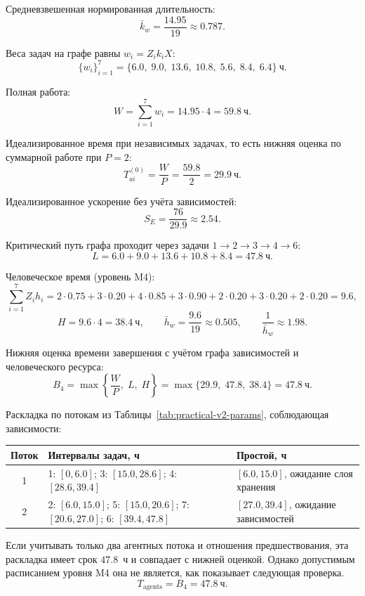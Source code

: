 \documentclass[12pt,a4paper]{article}
\theoremstyle{definition}
\begin{document}
Средневзвешенная нормированная длительность:
\[
  \bar{k}_w = \frac{14.95}{19} \approx 0.787.
\]

Веса задач на графе равны $w_i = Z_i k_i X$:
\[
  \{w_i\}_{i=1}^{7} = \{6.0,\; 9.0,\; 13.6,\; 10.8,\; 5.6,\; 8.4,\; 6.4\}~\text{ч}.
\]

Полная работа:
\[
  W = \sum_{i=1}^{7} w_i = 14.95 \cdot 4 = 59.8~\text{ч}.
\]

Идеализированное время при независимых задачах, то есть нижняя оценка по суммарной работе при $P = 2$:
\[
  T_{ai}^{(0)} = \frac{W}{P} = \frac{59.8}{2} = 29.9~\text{ч}.
\]

Идеализированное ускорение без учёта зависимостей:
\[
  S_E = \frac{76}{29.9} \approx 2.54.
\]

Критический путь графа проходит через задачи $1 \to 2 \to 3 \to 4 \to 6$:
\[
  L = 6.0 + 9.0 + 13.6 + 10.8 + 8.4 = 47.8~\text{ч}.
\]

Человеческое время (уровень M4):
\[
  \sum_{i=1}^{7} Z_i h_i = 2{\cdot}0.75 + 3{\cdot}0.20 + 4{\cdot}0.85 + 3{\cdot}0.90 + 2{\cdot}0.20 + 3{\cdot}0.20 + 2{\cdot}0.20 = 9.6,
\]
\[
  H = 9.6 \cdot 4 = 38.4~\text{ч},
  \qquad
  \bar{h}_w = \frac{9.6}{19} \approx 0.505,
  \qquad
  \frac{1}{\bar{h}_w} \approx 1.98.
\]

Нижняя оценка времени завершения с учётом графа зависимостей и человеческого ресурса:
\[
  B_4 = \max\left\{\frac{W}{P},\; L,\; H\right\} = \max\{29.9,\; 47.8,\; 38.4\} = 47.8~\text{ч}.
\]

Раскладка по потокам из Таблицы~\ref{tab:practical-v2-params}, соблюдающая зависимости:
\begin{center}
\small
\begin{tabularx}{\textwidth}{cXX}
\toprule
Поток & Интервалы задач, ч & Простой, ч \\
\midrule
1 & 1: $[0,6.0]$; 3: $[15.0,28.6]$; 4: $[28.6,39.4]$ & $[6.0,15.0]$, ожидание слоя хранения \\
2 & 2: $[6.0,15.0]$; 5: $[15.0,20.6]$; 7: $[20.6,27.0]$; 6: $[39.4,47.8]$ & $[27.0,39.4]$, ожидание зависимостей \\
\bottomrule
\end{tabularx}
\end{center}

Если учитывать только два агентных потока и отношения предшествования, эта
раскладка имеет срок $47.8$~ч и совпадает с нижней оценкой. Однако допустимым
расписанием уровня M4 она не является, как показывает следующая проверка.
\[
  T_{\mathrm{agents}}=B_4=47.8~\text{ч}.
\]
\end{document}
